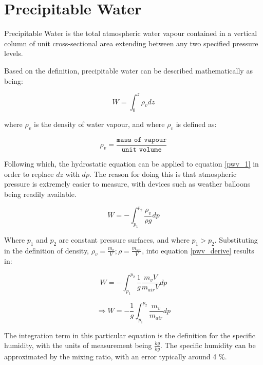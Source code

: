 \section{Precipitable Water}
\begin{definition}
Precipitable Water is the total atmospheric water vapour contained in a vertical column of unit cross-sectional area extending between any two specified pressure levels.
\end{definition}

Based on the definition, precipitable water can be described mathematically as being:

\begin{equation}
    \label{pwv_1}
    W = \int_{0}^{z} \rho_v dz
\end{equation}

where $\rho_v$ is the density of water vapour, and where $\rho_v$ is defined as:

\begin{equation}
    \rho_v = \frac{\texttt{mass of vapour}}{\texttt{unit volume}}
\end{equation}

Following which, the hydrostatic equation can be applied to equation \ref{pwv_1} in order to replace $dz$ with $dp$. The reason for doing this is that atmospheric pressure is extremely easier to measure, with devices such as weather balloons being readily available.

\begin{equation}
    \label{pwv_derive}
    W = -\int_{p_1}^{p_2} \frac{\rho_v}{\rho g} dp
\end{equation}

Where $p_1$ and $p_2$ are constant pressure surfaces, and where $p_1 > p_2$. Substituting in the definition of density, $\rho_v = \frac{m_v}{V}; \rho = \frac{m_{air}}{V}$, into equation \ref{pwv_derive} results in:

\begin{equation}
    W = -\int_{p_1}^{p_2} \frac{1}{g} \frac{m_v V}{m_{air} V} dp
\end{equation}

\begin{equation}
    \Rightarrow W = - \frac{1}{g} \int_{p_1}^{p_2} \frac{m_v}{m_{air}} dp
\end{equation}

The integration term in this particular equation is the definition for the specific humidity, with the units of measurement being $\frac{kg}{kg}$. The specific humidity can be approximated by the mixing ratio, with an error typically around 4 \%\cite{pwv_def}.

